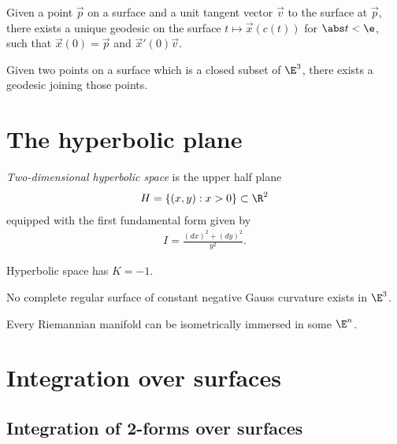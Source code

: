 \documentclass{article}
\begin{document}
\begin{proposition}[Notes 12.12]
	Given a point $\vec p$ on a surface and a unit tangent vector $\vec v$ to the surface at $\vec p$,
	there exists a unique geodesic on the surface $t\mapsto \vec x(c(t))$ for $\abs t < \e$,
	such that $\vec x(0) =\vec p$ and $\vec x'(0) \vec v$.
\end{proposition}

\begin{lemma}
	Given two points on a surface which is a closed subset of $\E^3$, there exists a geodesic
	joining those points.
\end{lemma}

\section{The hyperbolic plane}

\begin{definition}
	\emph{Two-dimensional hyperbolic space} is the upper half plane
	\begin{align*}
		H = \{(x,y) : x > 0\}\subset\R^2
	\end{align*}
	equipped with the first fundamental form given by
	\begin{align*}
		I = \frac{(dx)^2 + (dy)^2}{y^2}.
	\end{align*}
\end{definition}

\begin{theorem}[Notes 13.2]
	Hyperbolic space has $K=-1$.
\end{theorem}

\begin{theorem}[Hilbert]
	No complete regular surface of constant negative Gauss curvature exists in $\E^3$.
\end{theorem}

\begin{theorem}[Nash]
	Every Riemannian manifold can be isometrically immersed in some $\E^n$.
\end{theorem}

\section{Integration over surfaces}

\subsection{Integration of 2-forms over surfaces}
\end{document}
